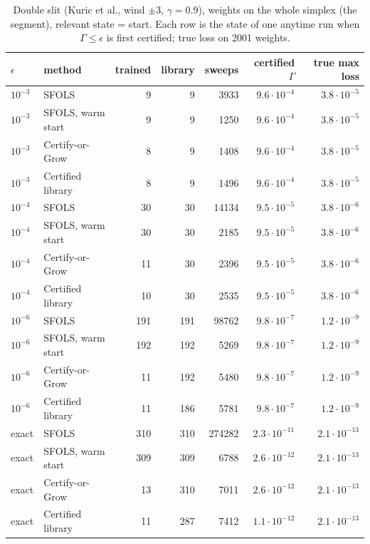 \begin{table}[h]\centering\small
\caption{Double slit (Kuric et al., wind $\pm3$, $\gamma=0.9$), weights on the whole simplex (the segment), relevant state = start. Each row is the state of one anytime run when $\Gamma\le\epsilon$ is first certified; true loss on 2001 weights.}\label{tab:ds}
\begin{tabular}{llrrrrr}
\toprule
$\epsilon$ & method & trained & library & sweeps & certified $\Gamma$ & true max loss\\
\midrule
$10^{-3}$ & SFOLS & 9 & 9 & 3933 & $9.6\cdot10^{-4}$ & $3.8\cdot10^{-5}$\\
$10^{-3}$ & SFOLS, warm start & 9 & 9 & 1250 & $9.6\cdot10^{-4}$ & $3.8\cdot10^{-5}$\\
$10^{-3}$ & Certify-or-Grow & 8 & 9 & 1408 & $9.6\cdot10^{-4}$ & $3.8\cdot10^{-5}$\\
$10^{-3}$ & Certified library & 8 & 9 & 1496 & $9.6\cdot10^{-4}$ & $3.8\cdot10^{-5}$\\
\midrule
$10^{-4}$ & SFOLS & 30 & 30 & 14134 & $9.5\cdot10^{-5}$ & $3.8\cdot10^{-6}$\\
$10^{-4}$ & SFOLS, warm start & 30 & 30 & 2185 & $9.5\cdot10^{-5}$ & $3.8\cdot10^{-6}$\\
$10^{-4}$ & Certify-or-Grow & 11 & 30 & 2396 & $9.5\cdot10^{-5}$ & $3.8\cdot10^{-6}$\\
$10^{-4}$ & Certified library & 10 & 30 & 2535 & $9.5\cdot10^{-5}$ & $3.8\cdot10^{-6}$\\
\midrule
$10^{-6}$ & SFOLS & 191 & 191 & 98762 & $9.8\cdot10^{-7}$ & $1.2\cdot10^{-9}$\\
$10^{-6}$ & SFOLS, warm start & 192 & 192 & 5269 & $9.8\cdot10^{-7}$ & $1.2\cdot10^{-9}$\\
$10^{-6}$ & Certify-or-Grow & 11 & 192 & 5480 & $9.8\cdot10^{-7}$ & $1.2\cdot10^{-9}$\\
$10^{-6}$ & Certified library & 11 & 186 & 5781 & $9.8\cdot10^{-7}$ & $1.2\cdot10^{-9}$\\
\midrule
exact & SFOLS & 310 & 310 & 274282 & $2.3\cdot10^{-11}$ & $2.1\cdot10^{-13}$\\
exact & SFOLS, warm start & 309 & 309 & 6788 & $2.6\cdot10^{-12}$ & $2.1\cdot10^{-13}$\\
exact & Certify-or-Grow & 13 & 310 & 7011 & $2.6\cdot10^{-12}$ & $2.1\cdot10^{-13}$\\
exact & Certified library & 11 & 287 & 7412 & $1.1\cdot10^{-12}$ & $2.1\cdot10^{-13}$\\

\bottomrule
\end{tabular}
\end{table}

